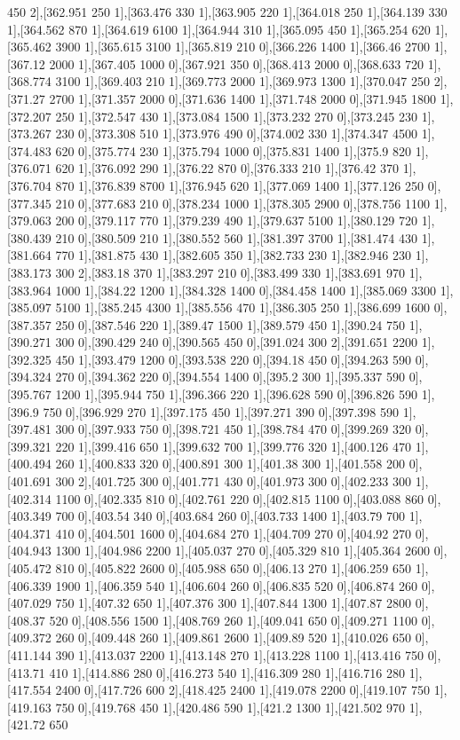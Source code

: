 {450 2],[362.951 250 1],[363.476 330 1],[363.905 220 1],[364.018 250 1],[364.139 330 1],[364.562 870 1],[364.619 6100 1],[364.944 310 1],[365.095 450 1],[365.254 620 1],[365.462 3900 1],[365.615 3100 1],[365.819 210 0],[366.226 1400 1],[366.46 2700 1],[367.12 2000 1],[367.405 1000 0],[367.921 350 0],[368.413 2000 0],[368.633 720 1],[368.774 3100 1],[369.403 210 1],[369.773 2000 1],[369.973 1300 1],[370.047 250 2],[371.27 2700 1],[371.357 2000 0],[371.636 1400 1],[371.748 2000 0],[371.945 1800 1],[372.207 250 1],[372.547 430 1],[373.084 1500 1],[373.232 270 0],[373.245 230 1],[373.267 230 0],[373.308 510 1],[373.976 490 0],[374.002 330 1],[374.347 4500 1],[374.483 620 0],[375.774 230 1],[375.794 1000 0],[375.831 1400 1],[375.9 820 1],[376.071 620 1],[376.092 290 1],[376.22 870 0],[376.333 210 1],[376.42 370 1],[376.704 870 1],[376.839 8700 1],[376.945 620 1],[377.069 1400 1],[377.126 250 0],[377.345 210 0],[377.683 210 0],[378.234 1000 1],[378.305 2900 0],[378.756 1100 1],[379.063 200 0],[379.117 770 1],[379.239 490 1],[379.637 5100 1],[380.129 720 1],[380.439 210 0],[380.509 210 1],[380.552 560 1],[381.397 3700 1],[381.474 430 1],[381.664 770 1],[381.875 430 1],[382.605 350 1],[382.733 230 1],[382.946 230 1],[383.173 300 2],[383.18 370 1],[383.297 210 0],[383.499 330 1],[383.691 970 1],[383.964 1000 1],[384.22 1200 1],[384.328 1400 0],[384.458 1400 1],[385.069 3300 1],[385.097 5100 1],[385.245 4300 1],[385.556 470 1],[386.305 250 1],[386.699 1600 0],[387.357 250 0],[387.546 220 1],[389.47 1500 1],[389.579 450 1],[390.24 750 1],[390.271 300 0],[390.429 240 0],[390.565 450 0],[391.024 300 2],[391.651 2200 1],[392.325 450 1],[393.479 1200 0],[393.538 220 0],[394.18 450 0],[394.263 590 0],[394.324 270 0],[394.362 220 0],[394.554 1400 0],[395.2 300 1],[395.337 590 0],[395.767 1200 1],[395.944 750 1],[396.366 220 1],[396.628 590 0],[396.826 590 1],[396.9 750 0],[396.929 270 1],[397.175 450 1],[397.271 390 0],[397.398 590 1],[397.481 300 0],[397.933 750 0],[398.721 450 1],[398.784 470 0],[399.269 320 0],[399.321 220 1],[399.416 650 1],[399.632 700 1],[399.776 320 1],[400.126 470 1],[400.494 260 1],[400.833 320 0],[400.891 300 1],[401.38 300 1],[401.558 200 0],[401.691 300 2],[401.725 300 0],[401.771 430 0],[401.973 300 0],[402.233 300 1],[402.314 1100 0],[402.335 810 0],[402.761 220 0],[402.815 1100 0],[403.088 860 0],[403.349 700 0],[403.54 340 0],[403.684 260 0],[403.733 1400 1],[403.79 700 1],[404.371 410 0],[404.501 1600 0],[404.684 270 1],[404.709 270 0],[404.92 270 0],[404.943 1300 1],[404.986 2200 1],[405.037 270 0],[405.329 810 1],[405.364 2600 0],[405.472 810 0],[405.822 2600 0],[405.988 650 0],[406.13 270 1],[406.259 650 1],[406.339 1900 1],[406.359 540 1],[406.604 260 0],[406.835 520 0],[406.874 260 0],[407.029 750 1],[407.32 650 1],[407.376 300 1],[407.844 1300 1],[407.87 2800 0],[408.37 520 0],[408.556 1500 1],[408.769 260 1],[409.041 650 0],[409.271 1100 0],[409.372 260 0],[409.448 260 1],[409.861 2600 1],[409.89 520 1],[410.026 650 0],[411.144 390 1],[413.037 2200 1],[413.148 270 1],[413.228 1100 1],[413.416 750 0],[413.71 410 1],[414.886 280 0],[416.273 540 1],[416.309 280 1],[416.716 280 1],[417.554 2400 0],[417.726 600 2],[418.425 2400 1],[419.078 2200 0],[419.107 750 1],[419.163 750 0],[419.768 450 1],[420.486 590 1],[421.2 1300 1],[421.502 970 1],[421.72 650 }
